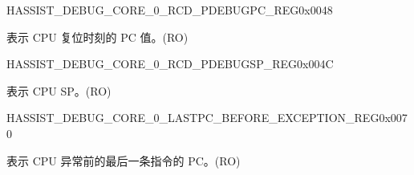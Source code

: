 \begin{register}{H}{ASSIST\_DEBUG\_CORE\_0\_RCD\_PDEBUGPC\_REG}{0x0048}\label{regdesc:ASSISTDEBUGCORE0RCDPDEBUGPCREG}
%
\regnewline%
\begin{regdesc}\begin{reglist}
\label{fielddesc:ASSISTDEBUGCORE0RCDPDEBUGPC}\item [ASSIST\_DEBUG\_CORE\_0\_RCD\_PDEBUGPC] 表示 CPU 复位时刻的 PC 值。(RO)
\end{reglist}\end{regdesc}
\end{register}


\begin{register}{H}{ASSIST\_DEBUG\_CORE\_0\_RCD\_PDEBUGSP\_REG}{0x004C}\label{regdesc:ASSISTDEBUGCORE0RCDPDEBUGSPREG}
%
\regnewline%
\begin{regdesc}\begin{reglist}
\label{fielddesc:ASSISTDEBUGCORE0RCDPDEBUGSP}\item [ASSIST\_DEBUG\_CORE\_0\_RCD\_PDEBUGSP] 表示 CPU SP。(RO)
\end{reglist}\end{regdesc}
\end{register}


\begin{register}{H}{ASSIST\_DEBUG\_CORE\_0\_LASTPC\_BEFORE\_EXCEPTION\_REG}{0x0070}\label{regdesc:ASSISTDEBUGCORE0LASTPCBEFOREEXCEPTIONREG}
%
\regnewline%
\begin{regdesc}\begin{reglist}
\label{fielddesc:ASSISTDEBUGCORE0LASTPCBEFOREEXC}\item [ASSIST\_DEBUG\_CORE\_0\_LASTPC\_BEFORE\_EXC] 表示 CPU 异常前的最后一条指令的 PC。(RO)
\end{reglist}\end{regdesc}
\end{register}


